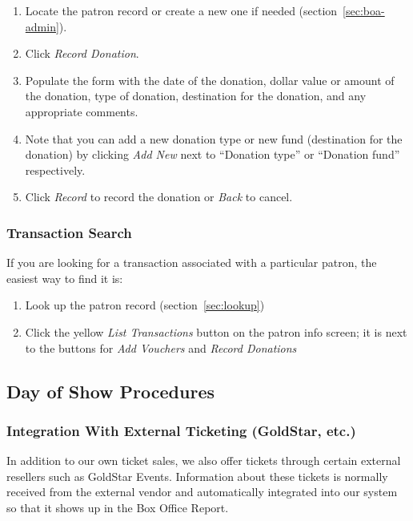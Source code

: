 \begin{enumerate}
\item  Locate the patron record or create a new one if needed
  (section~\ref{sec:boa-admin}). 
\item Click \emph{Record Donation}.
\item Populate the form with the date of the donation, dollar value or
  amount of the donation, type of donation, destination for the
  donation, and any appropriate comments.
\item Note that you can add a new donation type or new fund (destination
  for the donation) by clicking \emph{Add New} next to ``Donation type''
  or ``Donation fund'' respectively.
\item Click \emph{Record} to record the donation or \emph{Back} to
  cancel. 

\end{enumerate}

\subsubsection{Transaction Search}
\label{sec:txnsearch}

If you are looking for a transaction associated with a particular
patron, the easiest way to find it is:

\begin{enumerate}
\item Look up the patron record (section~\ref{sec:lookup})
\item Click the yellow \emph{List Transactions} button on the patron
  info screen; it is next to the buttons for \emph{Add Vouchers} and
  \emph{Record Donations}
\end{enumerate}

\subsection{Day of Show Procedures}
\label{sec:dayofshow}

\subsubsection{Integration With External Ticketing (GoldStar, etc.)}
\label{sec:externalticketing}

In addition to our own ticket sales, we also offer tickets through
certain external resellers such as GoldStar Events.  Information about
these tickets is normally received from the external vendor and
automatically integrated into our system so that it shows up in the Box
Office Report.

